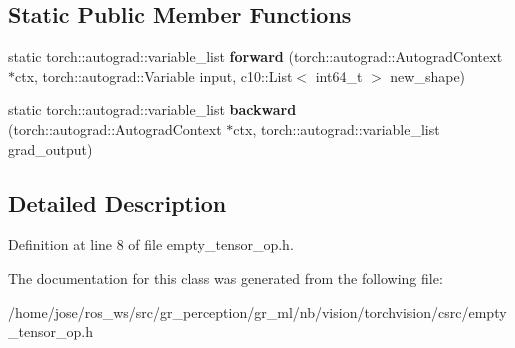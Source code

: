 \subsection*{Static Public Member Functions}
\begin{DoxyCompactItemize}
\item 
\mbox{\label{classNewEmptyTensorOp_aebb0fb3a166087e57b22ce275fc5f16f}} 
static torch\+::autograd\+::variable\+\_\+list {\bfseries forward} (torch\+::autograd\+::\+Autograd\+Context $\ast$ctx, torch\+::autograd\+::\+Variable input, c10\+::\+List$<$ int64\+\_\+t $>$ new\+\_\+shape)
\item 
\mbox{\label{classNewEmptyTensorOp_ac8d0df92b801030b2f372bbeee38a21b}} 
static torch\+::autograd\+::variable\+\_\+list {\bfseries backward} (torch\+::autograd\+::\+Autograd\+Context $\ast$ctx, torch\+::autograd\+::variable\+\_\+list grad\+\_\+output)
\end{DoxyCompactItemize}


\subsection{Detailed Description}


Definition at line 8 of file empty\+\_\+tensor\+\_\+op.\+h.



The documentation for this class was generated from the following file\+:\begin{DoxyCompactItemize}
\item 
/home/jose/ros\+\_\+ws/src/gr\+\_\+perception/gr\+\_\+ml/nb/vision/torchvision/csrc/empty\+\_\+tensor\+\_\+op.\+h\end{DoxyCompactItemize}
